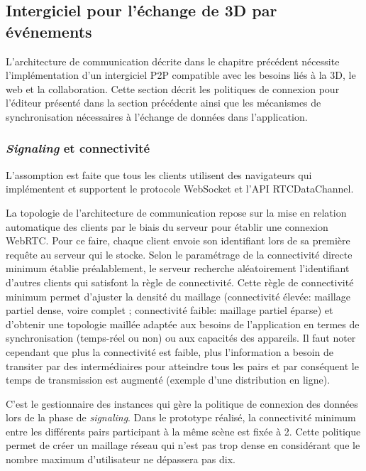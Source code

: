\subsection{Intergiciel pour l'échange de 3D par événements}

L'architecture de communication décrite dans le chapitre précédent nécessite 
l'implémentation d'un intergiciel \gls{P2P} compatible avec les besoins liés à la 
3D, le web et la collaboration. Cette section décrit les politiques de connexion 
pour l'éditeur présenté dans la section précédente ainsi que les mécanismes de 
synchronisation nécessaires à l'échange de données dans l'application. 

\subsubsection{\textit{Signaling} et connectivité}
L'assomption est faite que tous les clients utilisent des navigateurs qui 
implémentent et supportent le protocole WebSocket et l'\gls{API} 
RTCDataChannel. 

La topologie de l'architecture de communication repose sur la mise en relation 
automatique des clients par le biais du serveur pour établir une connexion 
\gls{WebRTC}. Pour ce faire, chaque client envoie son identifiant lors de sa 
première requête au serveur qui le stocke. Selon le paramétrage de la connectivité 
directe minimum établie préalablement, le serveur recherche aléatoirement l'identifiant
d'autres clients qui satisfont la règle de connectivité. Cette règle de connectivité 
minimum permet d'ajuster la densité du maillage (connectivité élevée: maillage 
partiel dense, voire complet ; connectivité faible: maillage partiel éparse) et 
d'obtenir une topologie maillée adaptée aux besoins de l'application en termes de 
synchronisation (temps-réel ou non) ou aux capacités des appareils. Il faut noter 
cependant que plus la connectivité est faible, plus l'information a besoin de 
transiter par des intermédiaires pour atteindre tous les pairs et par conséquent le 
temps de transmission est augmenté (exemple d'une distribution en ligne). 


C'est le gestionnaire des instances qui gère la politique de connexion des données lors de la 
phase de \textit{signaling}. Dans le prototype réalisé, 
la connectivité minimum entre les différents pairs participant à la même scène est 
fixée à 2. Cette politique permet de créer un maillage réseau qui n'est pas trop 
dense en considérant que le nombre maximum d'utilisateur ne dépassera pas dix.

